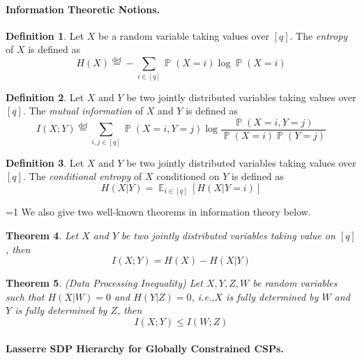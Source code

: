 \documentclass[11pt]{article}
\def\full{1}
\newtheorem{theorem}{Theorem}[section]
\theoremstyle{definition}
\newtheorem{definition}[theorem]{Definition}
\newcommand{\Esymb}{\mathbb{E}}
\newcommand{\Psymb}{\mathbb{P}}
\DeclareMathOperator*{\E}{\Esymb}
\DeclareMathOperator*{\ProbOp}{\Psymb}
\renewcommand{\Pr}{\ProbOp}
\newcommand{\defeq}{\stackrel{\mathrm{def}}=}
\newcommand{\ie}{i.e.,\xspace}
\renewcommand{\leq}{\leqslant}
\numberwithin{equation}{section}
\let\origparagraph\paragraph
\renewcommand{\paragraph}[1]{\origparagraph{#1.}}
\begin{document}
\paragraph{Information Theoretic Notions}
\begin{definition} \label{def:entropy}
Let $X$ be a random variable taking values over $[q]$. The \emph{entropy} of $X$ is defined as
$$
H(X)\defeq -\sum_{i\in[q]}\Pr(X=i)\log\Pr(X=i)
$$
\end{definition}
\begin{definition}\label{def:mutualinfo}
Let $X$ and $Y$ be two jointly distributed variables taking values over $[q]$. The \emph{mutual information} of $X$ and $Y$ is defined as
$$
I(X;Y)\defeq\sum_{i,j\in [q]}\Pr(X=i,Y=j)\log \frac{\Pr(X=i,Y=j)}{\Pr(X=i)\Pr(Y=j)}
$$
\end{definition}
\begin{definition}\label{def:conditionalentropy}
Let $X$ and $Y$ be two jointly distributed variables taking values over $[q]$. The \emph{conditional entropy} of $X$ conditioned on $Y$ is defined as
$$
H(X|Y)=\E_{i\in [q]}[H(X|Y=i)]
$$
\end{definition}
\ifnum\full=1
We also give two well-known theorems in information theory below.
\begin{theorem} \label{thm:entropy-info}
Let $X$ and $Y$ be two jointly distributed variables taking value on $[q]$, then
$$
I(X;Y)=H(X)-H(X|Y)
$$
\end{theorem}
\begin{theorem} \label{thm:dataprocessing} (Data Processing
Inequality)
Let $X,Y,Z,W$ be random variables such that $H(X|W)=0$ and $H(Y|Z)=0$, \ie $X$ is fully determined by $W$ and $Y$ is fully determined by $Z$, then
$$
I(X;Y)\leq I(W;Z)
$$
\end{theorem}
\fi

\paragraph{Lasserre SDP Hierarchy for Globally Constrained CSPs} \label{subsec:lasserresdp}
\end{document}
